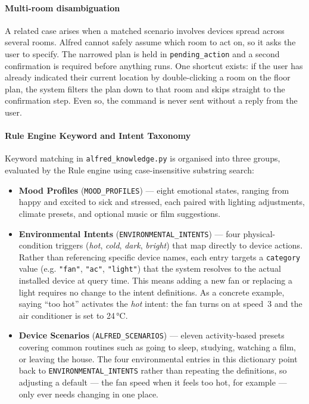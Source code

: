 \paragraph{Multi-room disambiguation}
A related case arises when a matched scenario involves devices spread across several rooms. Alfred cannot safely assume which room to act on, so it asks the user to specify. The narrowed plan is held in \texttt{pending\_action} and a second confirmation is required before anything runs. One shortcut exists: if the user has already indicated their current location by double-clicking a room on the floor plan, the system filters the plan down to that room and skips straight to the confirmation step. Even so, the command is never sent without a reply from the user.

\paragraph{Rule Engine Keyword and Intent Taxonomy} \label{sec:alfred_rule_keywords}

Keyword matching in \texttt{alfred\_knowledge.py} is organised into three groups, evaluated by the Rule engine using case-insensitive substring search:

\begin{itemize}
    \item \textbf{Mood Profiles} (\texttt{MOOD\_PROFILES}) --- eight emotional states, ranging from happy and excited to sick and stressed, each paired with lighting adjustments, climate presets, and optional music or film suggestions.

    \item \textbf{Environmental Intents} (\texttt{ENVIRONMENTAL\_INTENTS}) --- four physical-condition triggers (\textit{hot}, \textit{cold}, \textit{dark}, \textit{bright}) that map directly to device actions. Rather than referencing specific device names, each entry targets a \texttt{category} value (e.g. \texttt{"fan"}, \texttt{"ac"}, \texttt{"light"}) that the system resolves to the actual installed device at query time. This means adding a new fan or replacing a light requires no change to the intent definitions. As a concrete example, saying ``too hot'' activates the \textit{hot} intent: the fan turns on at speed~3 and the air conditioner is set to 24\,°C.

    \item \textbf{Device Scenarios} (\texttt{ALFRED\_SCENARIOS}) --- eleven activity-based presets covering common routines such as going to sleep, studying, watching a film, or leaving the house. The four environmental entries in this dictionary point back to \texttt{ENVIRONMENTAL\_INTENTS} rather than repeating the definitions, so adjusting a default --- the fan speed when it feels too hot, for example --- only ever needs changing in one place.
\end{itemize}

